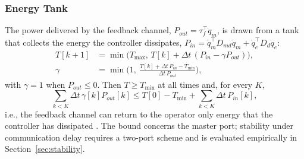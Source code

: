 \documentclass[a4paper, 10pt, conference]{ieeeconf}      %
\begin{document}
\subsubsection{Energy Tank}
The power delivered by the feedback channel, $P_{out}=\tau_f^{\top}\dot q_m$, is drawn from a tank that collects the energy the controller dissipates, $P_{in}=\dot q_m^{\top}D_{md}\dot q_m+\dot q_e^{\top}D_d\dot q_e$:
\begin{equation}
\begin{aligned}
T[k+1]&=\min\!\big(T_{\max},\,T[k]+\Delta t\,(P_{in}-\gamma P_{out})\big),\\
\gamma&=\min\!\Big(1,\ \frac{T[k]+\Delta t\,P_{in}-T_{\min}}{\Delta t\,P_{out}}\Big),
\end{aligned}
\end{equation}
with $\gamma=1$ when $P_{out}\le0$.
Then $T\ge T_{\min}$ at all times and, for every $K$,
\begin{equation}
\textstyle\sum_{k<K}\Delta t\,\gamma[k]P_{out}[k]\le T[0]-T_{\min}+\sum_{k<K}\Delta t\,P_{in}[k],
\end{equation}
i.e., the feedback channel can return to the operator only energy that the controller has dissipated \cite{ferraguti2015}. The bound concerns the master port; stability under communication delay requires a two-port scheme \cite{anderson1989,hannaford2002} and is evaluated empirically in Section~\ref{sec:stability}.
\end{document}
